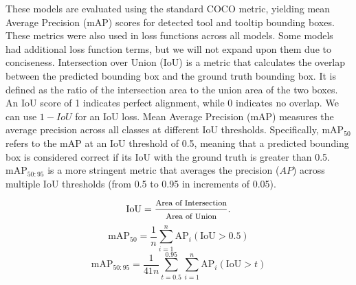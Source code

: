 These models are evaluated using the standard COCO metric, yielding mean Average Precision (mAP) scores for detected tool and tooltip bounding boxes. These metrics were also used in loss functions across all models. Some models had additional loss function terms, but we will not expand upon them due to conciseness. Intersection over Union (IoU) is a metric that calculates the overlap between the predicted bounding box and the ground truth bounding box. It is defined as the ratio of the intersection area to the union area of the two boxes. An IoU score of 1 indicates perfect alignment, while 0 indicates no overlap. We can use $1 - IoU$ for an IoU loss. Mean Average Precision (mAP) measures the average precision across all classes at different IoU thresholds. Specifically, mAP$_{50}$ refers to the mAP at an IoU threshold of 0.5, meaning that a predicted bounding box is considered correct if its IoU with the ground truth is greater than 0.5. mAP$_{50:95}$ is a more stringent metric that averages the precision ($AP$) across multiple IoU thresholds (from 0.5 to 0.95 in increments of 0.05). 

\begin{small}
\begin{equation}
    \text{IoU} = \frac{\text{\footnotesize{Area of Intersection}}}{\text{\footnotesize{Area of Union}}}.
\end{equation}
\begin{equation}
    \text{mAP}_{50} = \frac{1}{n} \sum_{i=1}^{n} \text{AP}_{i}(\text{IoU} > 0.5)
\end{equation}
\begin{equation}
    \text{mAP}_{50:95} = \frac{1}{41n} \sum_{t=0.5}^{0.95} \sum_{i=1}^{n} \text{AP}_{i}(\text{IoU} > t)
\end{equation}
\end{small}